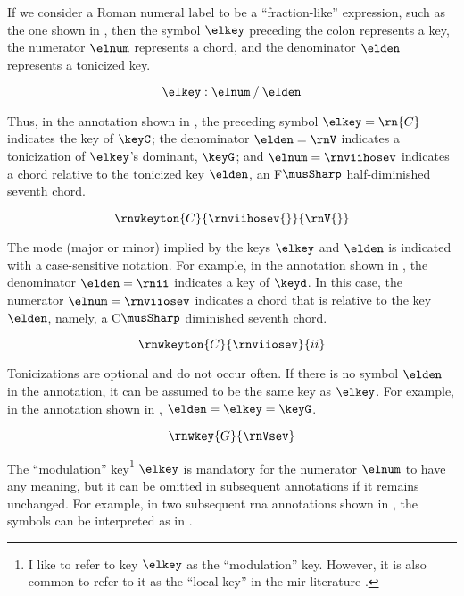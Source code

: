 
If we consider a Roman numeral label to be a
``fraction-like'' expression, such as the one shown in
, then the symbol $\elkey$ preceding
the colon represents a key, the numerator $\elnum$
represents a chord, and the denominator $\elden$ represents
a tonicized key.

\begin{equation}
    \label{eq:rn_expression}
    \elkey : \elnum \: / \: \elden
\end{equation}

Thus, in the annotation shown in , the
preceding symbol $\elkey=\rn{C}$ indicates the key of
$\keyC$; the denominator $\elden = \rnV$ indicates a
tonicization of $\elkey$'s dominant, $\keyG$; and
$\elnum=\rnviihosev$ indicates a chord relative to the
tonicized key $\elden$, an F$\musSharp$ half-diminished
seventh chord.

\begin{equation}
    \label{eq:rn_example1}
    \rnwkeyton{C}{\rnviihosev{}}{\rnV{}}
\end{equation}


The mode (major or minor) implied by the keys $\elkey$ and
$\elden$ is indicated with a case-sensitive notation. For
example, in the annotation shown in , the
denominator $\elden=\rnii$ indicates a key of $\keyd$. In
this case, the numerator $\elnum = \rnviiosev$ indicates a
chord that is relative to the key $\elden$, namely, a
C$\musSharp$ diminished seventh chord.

\begin{equation}
    \label{eq:rn_example2}
    \rnwkeyton{C}{\rnviiosev}{ii}
\end{equation}

Tonicizations are optional and do not occur often. If there
is no symbol $\elden$ in the annotation, it can be assumed
to be the same key as $\elkey$. For example, in the
annotation shown in , $\elden = \elkey =
\keyG$.

\begin{equation}
    \label{eq:rn_example3}
    \rnwkey{G}{\rnVsev}
\end{equation}

The ``modulation'' key\footnote{I like to refer to key
$\elkey$ as the ``modulation'' key. However, it is also
common to refer to it as the ``local key'' in the \gls{mir}
literature \parencite{napoleslopez2020local}.} $\elkey$ is
mandatory for the numerator $\elnum$ to have any meaning,
but it can be omitted in subsequent annotations if it
remains unchanged. For example, in two subsequent \gls{rna}
annotations shown in , the
symbols can be interpreted as in
.


